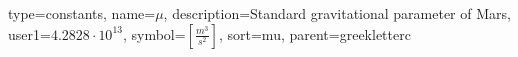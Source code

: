 {
type=constants, %
name={\ensuremath{\mu}}, %
description={Standard gravitational parameter of Mars}, %
user1={$4.2828\cdot 10^{13}$}, %
symbol={$\left[\frac{m^3}{s^{2}}\right]$}, %
sort=mu, %
parent=greekletterc %
}